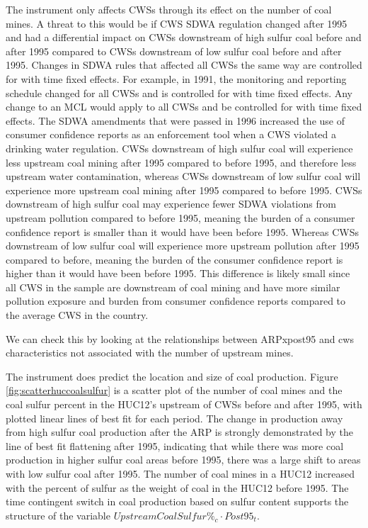 \documentclass{article}
\begin{document}
The instrument only affects CWSs through its effect on the number of coal mines. A threat to this would be if CWS SDWA regulation changed after 1995 and had a differential impact on CWSs downstream of high sulfur coal before and after 1995 compared to CWSs downstream of low sulfur coal before and after 1995. Changes in SDWA rules that affected all CWSs the same way are controlled for with time fixed effects. For example, in 1991, the monitoring and reporting schedule changed for all CWSs and is controlled for with time fixed effects. Any change to an MCL would apply to all CWSs and be controlled for with time fixed effects. The SDWA amendments that were passed in 1996 increased the use of consumer confidence reports as an enforcement tool when a CWS violated a drinking water regulation. CWSs downstream of high sulfur coal will experience less upstream coal mining after 1995 compared to before 1995, and therefore less upstream water contamination, whereas CWSs downstream of low sulfur coal will experience more upstream coal mining after 1995 compared to before 1995. CWSs downstream of high sulfur coal may experience fewer SDWA violations from upstream pollution compared to before 1995, meaning the burden of a consumer confidence report is smaller than it would have been before 1995. Whereas CWSs downstream of low sulfur coal will experience more upstream pollution after 1995 compared to before, meaning the burden of the consumer confidence report is higher than it would have been before 1995. This difference is likely small since all CWS in the sample are downstream of coal mining and have more similar pollution exposure and burden from consumer confidence reports compared to the average CWS in the country.

We can check this by looking at the relationships between ARPxpost95 and cws characteristics not associated with the number of upstream mines.

The instrument does predict the location and size of coal production. Figure \ref{fig:scatterhuccoalsulfur} is a scatter plot of the number of coal mines and the coal sulfur percent in the HUC12's upstream of CWSs before and after 1995, with plotted linear lines of best fit for each period. The change in production away from high sulfur coal production after the ARP is strongly demonstrated by the line of best fit flattening after 1995, indicating that while there was more coal production in higher sulfur coal areas before 1995, there was a large shift to areas with low sulfur coal after 1995. The number of coal mines in a HUC12 increased with the percent of sulfur as the weight of coal in the HUC12 before 1995. The time contingent switch in coal production based on sulfur content supports the structure of the variable $UpstreamCoalSulfur\%_c \cdot Post95_t$. 
\end{document}
